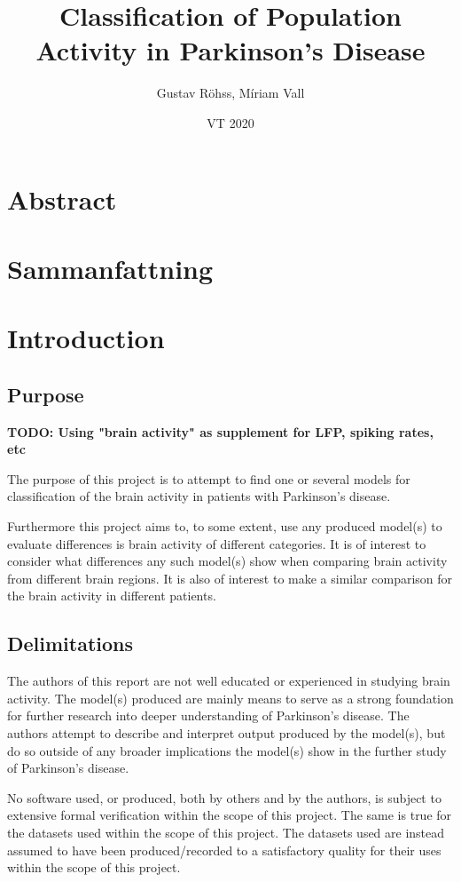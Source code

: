\documentclass{article}
\title{Classification of Population Activity in Parkinson's Disease}
\author{Gustav Röhss, Míriam Vall}
\date{VT 2020}
\begin{document}
\maketitle

\section*{Abstract}
\section*{Sammanfattning}

\newpage
\tableofcontents

\newpage
\section{Introduction}

\subsection{Purpose}

\textbf{TODO: Using "brain activity" as supplement for LFP, spiking rates, etc}

The purpose of this project is to attempt to find one or several models for classification of the brain activity in patients with Parkinson's disease.

Furthermore this project aims to, to some extent, use any produced model(s) to evaluate differences is brain activity of different categories.
It is of interest to consider what differences any such model(s) show when comparing brain activity from different brain regions.
It is also of interest to make a similar comparison for the brain activity in different patients.

\subsection{Delimitations}
The authors of this report are not well educated or experienced in studying brain activity.
The model(s) produced are mainly means to serve as a strong foundation for further research into deeper understanding of Parkinson's disease.
The authors attempt to describe and interpret output produced by the model(s), but do so outside of any broader implications the model(s) show in the further study of Parkinson's disease.

No software used, or produced, both by others and by the authors, is subject to extensive formal verification within the scope of this project. 
The same is true for the datasets used within the scope of this project.
The datasets used are instead assumed to have been produced/recorded to a satisfactory quality for their uses within the scope of this project.
\end{document}
